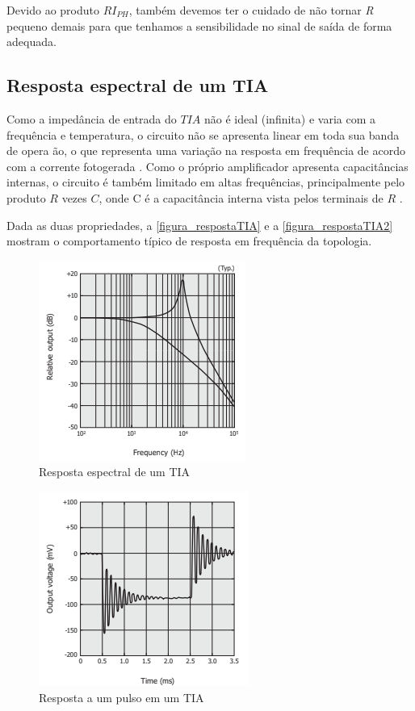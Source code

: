 Devido ao produto $RI_{PH}$, também devemos ter o cuidado de não tornar \textit{R} pequeno demais para que tenhamos a sensibilidade no sinal de saída de forma adequada.

\subsection{Resposta espectral de um TIA}

Como a imped\^ancia de entrada do $TIA$ não \'e ideal (infinita) e varia com a frequ\^encia e temperatura, o circuito não se apresenta linear em toda sua banda de opera ão, o que representa uma variação na resposta em frequ\^encia de acordo com a corrente fotogerada \cite{hamamatsu}.
Como o pr\'oprio amplificador apresenta capacit\^ancias internas, o circuito \'e tamb\'em limitado em altas frequ\^encias, principalmente pelo produto $R$ vezes $C$, onde C \'e a capacit\^ancia interna vista pelos terminais de $R$ \cite{hamamatsu}.

Dada as duas propriedades, a \autoref{figura_respostaTIA} e a \autoref{figura_respostaTIA2} mostram o comportamento t\'ipico de resposta em frequ\^encia da topologia.

\begin{figure}[htb]
	\caption{\label{figura_respostaTIA}Resposta espectral de um TIA}
	\begin{center}
	    \includegraphics[scale=0.8]{Imagens/RespostaEspectralTIA.png}
	\end{center}
\end{figure}

\begin{figure}[htb]
	\caption{\label{figura_respostaTIA2}Resposta a um pulso em um TIA}
	\begin{center}
	    \includegraphics[scale=0.8]{Imagens/RespostaEspectralTIA2.png}
	\end{center}
\end{figure}

\clearpage